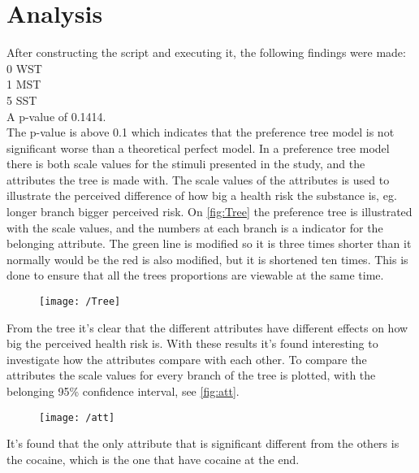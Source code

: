 \section{Analysis}
\label{Analysis}
After constructing the script and executing it, the following findings were made:\\
0 WST\\
1 MST\\
5 SST\\
A p-value of 0.1414.\\
The p-value is above 0.1 which indicates that the preference tree model is not significant worse than a theoretical perfect model.
In a preference tree model there is both scale values for the stimuli presented in the study, and the attributes the tree is made with. 
The scale values of the attributes is used to illustrate the perceived difference of how big a health risk the substance is, eg. longer branch bigger perceived risk. 
On \autoref{fig:Tree} the preference tree is illustrated with the scale values, and the numbers at each branch is a indicator for the belonging attribute. 
The \textcolor{xGreen}{green} line is modified so it is three times shorter than it normally would be the \textcolor{xRed}{red} is also modified, but it is shortened ten times.
This is done to ensure that all the trees proportions are viewable at the same time.
\begin{figure}[H]
	\centering
	\texttt{[image: /Tree]}
	\caption{}
	\label{fig:Tree}
\end{figure}
\noindent
From the tree it's clear that the different attributes have different effects on how big the perceived health risk is. With these results it's found interesting to investigate how the attributes compare with each other. To compare the attributes the scale values for every branch of the tree is plotted, with the belonging 95\% confidence interval, see \autoref{fig:att}.
\begin{figure}[H]
	\centering
	\texttt{[image: /att]}
	\caption{}
	\label{fig:att}
\end{figure}
\noindent
It's found that the only attribute that is significant different from the others is the cocaine, which is the one that have cocaine at the end.